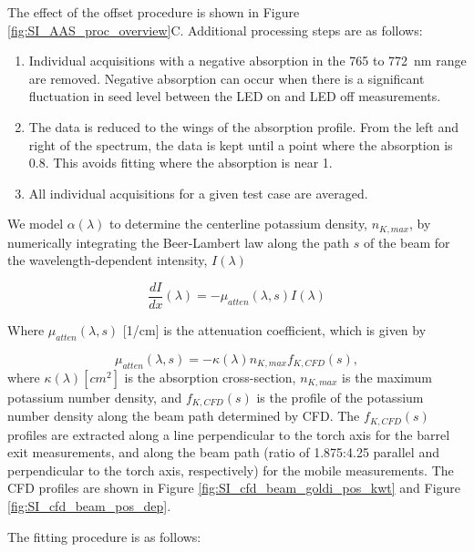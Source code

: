 The effect of the offset procedure is shown in Figure \ref{fig:SI_AAS_proc_overview}C. Additional processing steps are as follows:

\begin{enumerate}
    \item Individual acquisitions with a negative absorption in the 765 to \SI{772} {\nano\meter} range are removed. Negative absorption can occur when there is a significant fluctuation in seed level between the LED on and LED off measurements.
    \item The data is reduced to the wings of the absorption profile. From the left and right of the spectrum, the data is kept until a point where the absorption is 0.8. This avoids fitting where the absorption is near 1. 
    \item All individual acquisitions for a given test case are averaged.
\end{enumerate}
We model $\alpha(\lambda)$ to determine the centerline potassium density, $n_{K,max}$, by numerically integrating the Beer-Lambert law along the path $s$ of the beam for the wavelength-dependent intensity, $I(\lambda)$

\begin{equation}
    \frac{dI}{dx}(\lambda) = -\mu_{atten}(\lambda, s) I(\lambda)
\end{equation}

Where $\mu_{atten} (\lambda, s)$ [1/cm] is the attenuation coefficient, which is given by 

\begin{equation}
    \mu_{atten}(\lambda, s) = -\kappa(\lambda) n_{K,max} f_{K, CFD}(s),
\end{equation}
where $\kappa(\lambda) [cm^2]$ is the absorption cross-section, $n_{K,max}$ is the maximum potassium number density, and $f_{K, CFD}(s)$ is the profile of the potassium number density along the beam path determined by CFD. The $f_{K, CFD}(s)$ profiles are extracted along a line perpendicular to the torch axis for the barrel exit measurements, and along the beam path (ratio of 1.875:4.25 parallel and perpendicular to the torch axis, respectively) for the mobile measurements. The CFD profiles are shown in Figure \ref{fig:SI_cfd_beam_goldi_pos_kwt} and Figure \ref{fig:SI_cfd_beam_pos_dep}.

The fitting procedure is as follows:


